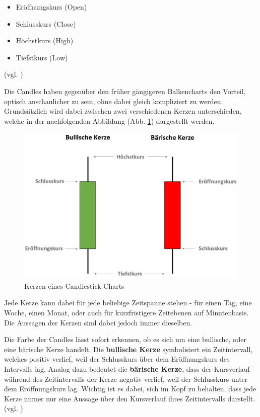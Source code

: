 \documentclass[oneside]{ausarbeitung}
\begin{document}
\begin{itemize}
	\item Eröffnungskurs (Open)
	\item Schlusskurs (Close)
	\item Höchstkurs (High)
	\item Tiefstkurs (Low)
\end{itemize}

(vgl. \cite{candlestick_basics})

Die Candles haben gegenüber den früher gängigeren Balkencharts den
Vorteil, optisch anschaulicher zu sein, ohne dabei gleich kompliziert
zu werden. Grundsätzlich wird dabei zwischen zwei verschiedenen
Kerzen unterschieden, welche in der nachfolgenden Abbildung
(Abb. \ref{fig:1}) dargestellt werden. \\

\begin{figure}[H]
  \centering
  \includegraphics[height=0.45\textheight]{img/candles.png}
  \caption{Kerzen eines Candlestick Charts}
  \label{fig:1}
\end{figure}

Jede Kerze kann dabei für jede beliebige Zeitspanne stehen - für
einen Tag, eine Woche, einen Monat, oder auch für kurzfristigere
Zeitebenen auf Minutenbasis. Die Aussagen der Kerzen sind dabei jedoch
immer dieselben.

Die Farbe der Candles lässt sofort erkennen, ob es sich um eine
bullische, oder eine bärische Kerze handelt. Die \textbf{bullische
Kerze} symbolisiert ein Zeitintervall, welches positiv verlief, weil
der Schlusskurs über dem Eröffnungskurs des Intervalls lag. Analog
dazu bedeutet die \textbf{bärische Kerze}, dass der Kursverlauf
während des Zeitintervalls der Kerze negativ verlief, weil der
Schlusskurs unter dem Eröffnungskurs lag. Wichtig ist es dabei, sich
im Kopf zu behalten, dass jede Kerze immer nur eine Aussage über den
Kursverlauf ihres Zeitintervalls darstellt. (vgl.
\cite{candles_explained})
 
\end{document}
